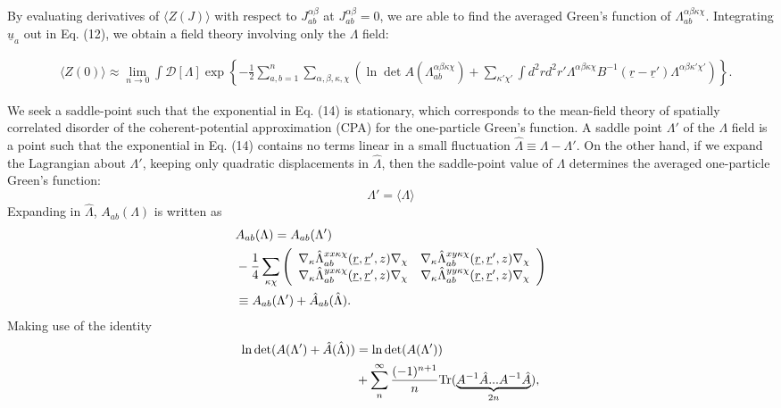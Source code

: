 \documentclass[twoside,twocolumn,9pt]{article}
\begin{document}
By evaluating derivatives of $\langle Z(J)\rangle$ with respect to $J^{\alpha\beta}_{ab}$ at $J^{\alpha\beta}_{ab}=0$, we are able to find the averaged Green's function of $\Lambda_{ab}^{\alpha\beta\kappa\chi}$.
Integrating $\underline{u}_a$ out in Eq. (12), we obtain a field theory involving only the $\Lambda$ field:
\begin{strip}
\begin{align}
&\langle Z(0)\rangle\approx\lim_{n\rightarrow0}\int\mathcal{D}[\Lambda]\exp\left\{-\frac{1}{2}\sum_{a,b=1}^n\sum_{\alpha,\beta,\kappa,\chi}\left(\ln\det A(\Lambda^{\alpha\beta\kappa\chi}_{ab})+\sum_{\kappa'\chi'}\int d^2rd^2r'\Lambda^{\alpha\beta\kappa\chi}B^{-1}(\underline{r}-\underline{r}')\Lambda^{\alpha\beta\kappa'\chi'}\right)\right\}.
\end{align}
\end{strip}
We seek a saddle-point such that the exponential in Eq. (14) is stationary, which corresponds to the mean-field theory of spatially correlated disorder of the coherent-potential approximation (CPA) for the one-particle Green's function. A saddle point $\Lambda'$ of the $\Lambda$ field is a point such that the exponential in Eq. (14) contains no terms linear in a small fluctuation $\hat{\Lambda}\equiv\Lambda-\Lambda'$. On the other hand, if we expand the Lagrangian about $\Lambda'$, keeping only quadratic displacements in $\hat{\Lambda}$, then the saddle-point value of $\Lambda$ determines the averaged one-particle Green's function:
\begin{equation}
\Lambda'=\langle\Lambda\rangle
\end{equation}
Expanding in $\hat{\Lambda}$, $A_{ab}(\Lambda)$ is written as
\begin{align}
&A_{ab}(\Lambda)=A_{ab}(\Lambda')\notag\\
&-\frac{1}{4}\sum_{\kappa\chi}\left(\begin{array}{cc}
\nabla_\kappa\hat{\Lambda}^{xx\kappa\chi}_{ab}(\underline{r},\underline{r}',z)\nabla_\chi & \nabla_\kappa\hat{\Lambda}^{xy\kappa\chi}_{ab}(\underline{r},\underline{r}',z)\nabla_\chi\\
\nabla_\kappa\hat{\Lambda}^{yx\kappa\chi}_{ab}(\underline{r},\underline{r}',z)\nabla_\chi & \nabla_\kappa\hat{\Lambda}^{yy\kappa\chi}_{ab}(\underline{r},\underline{r}',z)\nabla_\chi
\end{array}\right)\notag\\
&\equiv A_{ab}(\Lambda')+\hat{A}_{ab}(\hat{\Lambda}).
\end{align}
Making use of the identity
\begin{align}
\ln\det(A(\Lambda')+\hat{A}(\hat{\Lambda}))&=\ln\det(A(\Lambda'))\notag\\
&+\sum_n^\infty\frac{(-1)^{n+1}}{n}\text{Tr}(\underbrace{A^{-1}\hat{A}...A^{-1}\hat{A}}_{2n}),
\end{align}
\end{document}
